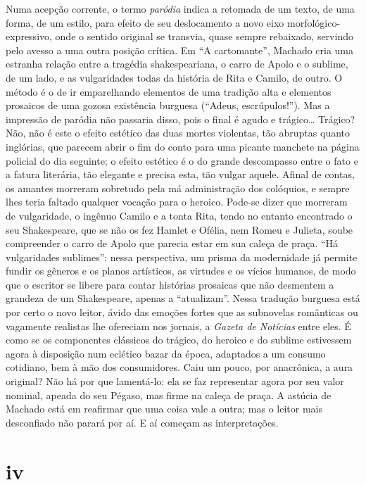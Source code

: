 Numa acepção corrente, o termo \emph{paródia} indica a retomada de um
texto, de uma forma, de um estilo, para efeito de seu deslocamento a
novo eixo morfológico-expressivo, onde o sentido original se transvia,
quase sempre rebaixado, servindo pelo avesso a uma outra posição
crítica. Em ``A cartomante'', Machado cria uma estranha relação entre a
tragédia shakespeariana, o carro de Apolo e o sublime, de um lado, e as
vulgaridades todas da história de Rita e Camilo, de outro. O método é o
de ir emparelhando elementos de uma tradição alta e elementos prosaicos
de uma gozosa existência burguesa (``Adeus, escrúpulos!''). Mas a
impressão de paródia não passaria disso, pois o final é agudo e
trágico\ldots{} Trágico? Não, não é este o efeito estético das duas
mortes violentas, tão abruptas quanto inglórias, que parecem abrir o fim
do conto para uma picante manchete na página policial do dia seguinte; o
efeito estético é o do grande descompasso entre o fato e a fatura
literária, tão elegante e precisa esta, tão vulgar aquele. Afinal de
contas, os amantes morreram sobretudo pela má administração dos
colóquios, e sempre lhes teria faltado qualquer vocação para o heroico.
Pode-se dizer que morreram de vulgaridade, o ingênuo Camilo e a tonta
Rita, tendo no entanto encontrado o seu Shakespeare, que se não os fez
Hamlet e Ofélia, nem Romeu e Julieta, soube compreender o carro de Apolo
que parecia estar em sua caleça de praça. ``Há vulgaridades sublimes'':
nessa perspectiva, um prisma da modernidade já permite fundir os gêneros
e os planos artísticos, as virtudes e os vícios humanos, de modo que o
escritor se libere para contar histórias prosaicas que não desmentem a
grandeza de um Shakespeare, apenas a ``atualizam''. Nessa tradução
burguesa está por certo o novo leitor, ávido das emoções fortes que as
subnovelas românticas ou vagamente realistas lhe ofereciam nos jornais,
a \emph{Gazeta de Notícias} entre eles. É como se os componentes
clássicos do trágico, do heroico e do sublime estivessem agora à
disposição num eclético bazar da época, adaptados a um consumo
cotidiano, bem à mão dos consumidores. Caiu um pouco, por anacrônica, a
aura original? Não há por que lamentá-lo: ela se faz representar agora
por seu valor nominal, apeada do seu Pégaso, mas firme na caleça de
praça. A astúcia de Machado está em reafirmar que uma coisa vale a
outra; mas o leitor mais desconfiado não parará por aí. E aí começam as
interpretações.

\section{iv}

